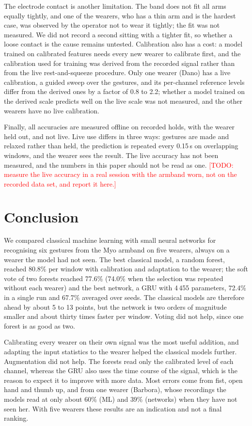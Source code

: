 \documentclass[conference]{IEEEtran}
\begin{document}
The electrode contact is another limitation. The band does not fit all arms equally
tightly, and one of the wearers, who has a thin arm and is the hardest case, was observed by
the operator not to wear it tightly; the fit was not measured. We did not record a
second sitting with a tighter fit, so whether a loose contact is the cause remains
untested. Calibration also has a cost: a model trained on
calibrated features needs every new wearer to calibrate first, and the calibration used
for training was derived from the recorded signal rather than from the live
rest-and-squeeze procedure. Only one wearer (Dano) has a live calibration, a guided
sweep over the gestures, and its per-channel reference levels differ from the derived
ones by a factor of 0.8 to 2.2; whether a model trained on the derived scale predicts
well on the live scale was not measured, and the other wearers have no live
calibration.

Finally, all accuracies are measured offline on recorded holds, with the wearer
held out, and not live. Live use differs in three ways: gestures are made and relaxed
rather than held, the prediction is repeated every 0.15\,s on overlapping windows, and
the wearer sees the result. The live accuracy has not been measured, and the numbers
in this paper should not be read as one.
\textcolor{red}{[TODO: measure the live accuracy in a real session with the armband worn,
not on the recorded data set, and report it here.]}

\section{Conclusion}
\label{sec:conclusion}
We compared classical machine learning with small neural networks for recognising six
gestures from the Myo armband on five wearers, always on a wearer the model had not
seen. The best classical model, a random forest, reached 80.8\% per window with
calibration and adaptation to the wearer; the soft vote of two forests reached 77.6\%
(74.0\% when the selection was repeated without each wearer) and the best network, a GRU
with 4\,455 parameters, 72.4\% in a single run and 67.7\% averaged over seeds. The
classical models are therefore ahead by about 5 to 13 points, but the network is two
orders of magnitude smaller and about thirty times faster per window. Voting did not
help, since one forest is as good as two.

Calibrating every wearer on their own signal was the most useful addition, and adapting
the input statistics to the wearer helped the classical models further. Augmentation did
not help. The forests read only the calibrated level of each channel, whereas the GRU
also uses the time course of the signal, which is the reason to expect it to improve with
more data. Most errors come from fist, open hand and thumb up, and from one wearer
(Barbora), whose recordings the models read at only about 60\% (ML) and 39\% (networks)
when they have not seen her. With five wearers these results are an indication and
not a final ranking.
\end{document}
